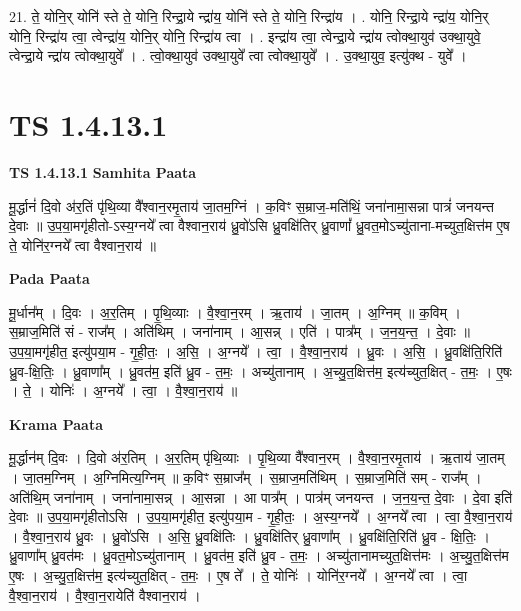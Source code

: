 \documentclass[17pt]{extarticle}
\begin{document}
21. ते॒ योनि॒र् योनि॑ स्ते ते॒ योनि॒ रिन्द्रा॒ये न्द्रा॑य॒ योनि॑ स्ते ते॒ योनि॒ रिन्द्रा॑य । . योनि॒ रिन्द्रा॒ये न्द्रा॑य॒ योनि॒र् योनि॒ रिन्द्रा॑य त्वा॒ त्वेन्द्रा॑य॒ योनि॒र् योनि॒ रिन्द्रा॑य त्वा । . इन्द्रा॑य त्वा॒ त्वेन्द्रा॒ये न्द्रा॑य त्वोक्था॒युव॑ उक्था॒युवे॒ त्वेन्द्रा॒ये न्द्रा॑य त्वोक्था॒युवे᳚ । . त्वो॒क्था॒युव॑ उक्था॒युवे᳚ त्वा त्वोक्था॒युवे᳚ । . उ॒क्था॒युव॒ इत्यु॑क्थ - युवे᳚ । \newline
\pagebreak
{}

\section{ TS 1.4.13.1 }

\textbf{TS 1.4.13.1 } \newline
\textbf{Samhita Paata} \newline

मू॒र्द्धानं॑ दि॒वो अ॑र॒तिं पृ॑थि॒व्या वै᳚श्वान॒रमृ॒ताय॑ जा॒तम॒ग्निं । क॒विꣳ स॒म्राज॒-मति॑थिं॒ जना॑नामा॒सन्ना पात्रं॑ जनयन्त दे॒वाः ॥ उ॒प॒या॒मगृ॑हीतो-ऽस्य॒ग्नये᳚ त्वा वैश्वान॒राय॑ ध्रु॒वो॑ऽसि ध्रु॒वक्षि॑तिर् ध्रु॒वाणां᳚ ध्रु॒वत॒मोऽच्यु॑ताना-मच्युत॒क्षित्त॑म ए॒ष ते॒ योनि॑र॒ग्नये᳚ त्वा वैश्वान॒राय॑ ॥ \newline

\textbf{Pada Paata} \newline

मू॒र्धान᳚म् । दि॒वः । अ॒र॒तिम् । पृ॒थि॒व्याः । वै॒श्वा॒न॒रम् । ऋ॒ताय॑ । जा॒तम् । अ॒ग्निम् ॥ क॒विम् । स॒म्राज॒मिति॑ सं - राज᳚म् । अति॑थिम् । जना॑नाम् । आ॒सन्न् । एति॑ । पात्र᳚म् । ज॒न॒य॒न्त॒ । दे॒वाः ॥ उ॒प॒या॒मगृ॑हीत॒ इत्यु॑पया॒म - गृ॒ही॒तः॒ । अ॒सि॒ । अ॒ग्नये᳚ । त्वा॒ । वै॒श्वा॒न॒राय॑ । ध्रु॒वः । अ॒सि॒ । ध्रु॒वक्षि॑ति॒रिति॑ ध्रु॒व-क्षि॒तिः॒ । ध्रु॒वाणा᳚म् । ध्रु॒वत॑म॒ इति॑ ध्रु॒व - त॒मः॒ । अच्यु॑तानाम् । अ॒च्यु॒त॒क्षित्त॑म॒ इत्य॑च्युत॒क्षित् - त॒मः॒ । ए॒षः । ते॒ । योनिः॑ । अ॒ग्नये᳚ । त्वा॒ । वै॒श्वा॒न॒राय॑ ॥  \newline


\textbf{Krama Paata} \newline

मू॒र्द्धान॑म् दि॒वः । दि॒वो अ॑र॒तिम् । अ॒र॒तिम् पृ॑थि॒व्याः । पृ॒थि॒व्या वै᳚श्वान॒रम् । वै॒श्वा॒न॒रमृ॒ताय॑ । ऋ॒ताय॑ जा॒तम् । जा॒तम॒ग्निम् । अ॒ग्निमित्य॒ग्निम् ॥ क॒विꣳ स॒म्राज᳚म् । स॒म्राज॒मति॑थिम् । स॒म्राज॒मिति॑ सम् - राज᳚म् । अति॑थि॒म् जना॑नाम् । जना॑नामा॒सन्न् । आ॒सन्ना । आ पात्र᳚म् । पात्र॑म् जनयन्त । ज॒न॒य॒न्त॒ दे॒वाः । दे॒वा इति॑ दे॒वाः ॥ उ॒प॒या॒मगृ॑हीतोऽसि । उ॒प॒या॒मगृ॑हीत॒ इत्यु॑पया॒म - गृ॒ही॒तः॒ । अ॒स्य॒ग्नये᳚ । अ॒ग्नये᳚ त्वा । त्वा॒ वै॒श्वा॒न॒राय॑ । वै॒श्वा॒न॒राय॑ ध्रु॒वः । ध्रु॒वो॑ऽसि । अ॒सि॒ ध्रु॒वक्षि॑तिः । ध्रु॒वक्षि॑तिर् ध्रु॒वाणा᳚म् । ध्रु॒वक्षि॑ति॒रिति॑ ध्रु॒व - क्षि॒तिः॒ । ध्रु॒वाणा᳚म् ध्रु॒वत॑मः । ध्रु॒वत॒मोऽच्यु॑तानाम् । ध्रु॒वत॑म॒ इति॑ ध्रु॒व - त॒मः॒ । अच्यु॑तानामच्युत॒क्षित्त॑मः । अ॒च्यु॒त॒क्षित्त॑म ए॒षः । अ॒च्यु॒त॒क्षित्त॑म॒ इत्य॑च्युत॒क्षित् - त॒मः॒ । ए॒ष ते᳚ । ते॒ योनिः॑ । योनि॑र॒ग्नये᳚ । अ॒ग्नये᳚ त्वा । त्वा॒ वै॒श्वा॒न॒राय॑ । वै॒श्वा॒न॒रायेति॑ वैश्वान॒राय॑ । \newline
\end{document}
